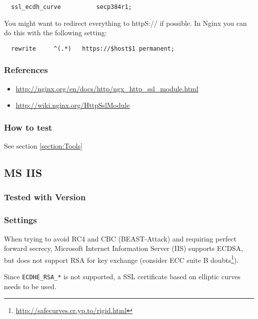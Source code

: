 \begin{lstlisting}
  ssl_ecdh_curve          secp384r1;
\end{lstlisting}

You might want to redirect everything to httpS:// if possible. In Nginx you can do this with the following setting:

\begin{lstlisting}
  rewrite     ^(.*)   https://$host$1 permanent;
\end{lstlisting}


\subsubsection{References} 
\begin{itemize}
  \item \url{http://nginx.org/en/docs/http/ngx_http_ssl_module.html}
  \item \url{http://wiki.nginx.org/HttpSslModule}
\end{itemize}

\subsubsection{How to test}
See section \ref{section:Tools}

\subsection{MS IIS}
\label{sec:ms-iis}


\subsubsection{Tested with Version} 


\subsubsection{Settings}

When trying to avoid RC4 and CBC (BEAST-Attack) and requiring perfect
forward secrecy, Microsoft Internet Information Server (IIS) supports
ECDSA, but does not support RSA for key exchange (consider ECC suite
B doubts\footnote{\url{http://safecurves.cr.yp.to/rigid.html}}).

Since \verb|ECDHE_RSA_*| is not supported, a SSL certificate based on
elliptic curves needs to be used.

